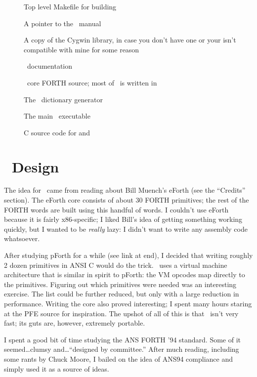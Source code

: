 \documentclass{article}
\begin{document}
\begin{description}
\item[] Top level Makefile for building \M
\item[] A pointer to the \M\  manual
\item[] A copy of the Cygwin library, in case you don't
  have one or your isn't compatible with mine for some reason
\item[] \M\ documentation
\item[] \M\ core FORTH source; most of \M\ is written
  in \M
\item[] The \M\ dictionary generator
\item[] The main \M\ executable
\item[] C source code for  and 
\end{description}

\section*{\M\ Design}

The idea for \M\ came from reading about Bill Muench's eForth (see the
``Credits'' section). The eForth core consists of about 30 FORTH
primitives; the rest of the FORTH words are built using this handful
of words. I couldn't use eForth because it is fairly x86-specific; I
liked Bill's idea of getting something working quickly, but I wanted
to be \textit{really} lazy: I didn't want to write any assembly code
whatsoever.

After studying pForth for a while (see link at end), I decided that
writing roughly 2 dozen primitives in ANSI C would do the trick. \M\
uses a virtual machine architecture that is similar in spirit to
pForth: the VM opcodes map directly to the primitives.  Figuring out
which primitives were needed was an interesting exercise. The list
could be further reduced, but only with a large reduction in
performance. Writing the core also proved interesting; I spent many
hours staring at the PFE source for inspiration. The upshot of all of
this is that \M\ isn't very fast; its guts are, however, extremely
portable.

I spent a good bit of time studying the ANS FORTH '94 standard.  Some
of it seemed\ldots clumsy and\ldots ``designed by committee.''  After
much reading, including some rants by Chuck Moore, I bailed on the
idea of ANS94 compliance and simply used it as a source of ideas.
\end{document}
